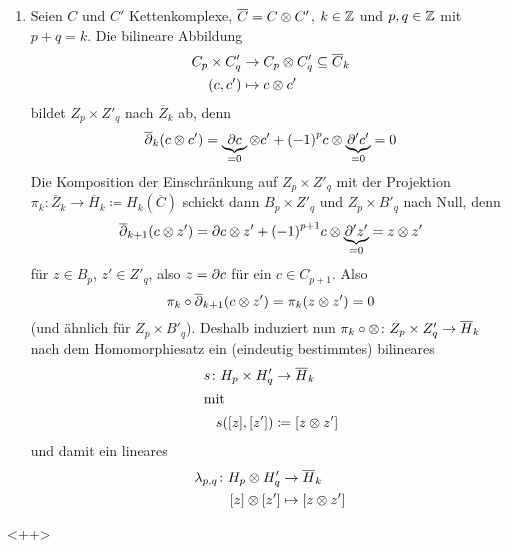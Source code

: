 \begin{vorbereitung}
  \begin{enumerate}
    \item
      Seien $C$ und $C'$ Kettenkomplexe, $\overline C = C \otimes C'$, $k \in \mathbb{Z}$ und $p, q \in \mathbb{Z}$ mit $p + q = k$.
      Die bilineare Abbildung
      \begin{align*}
        C_p \times C'_q & \to C_p \otimes C'_q \subseteq \overline C_k\\
        (c, c') & \mapsto c \otimes c'
      \end{align*}
      bildet $Z_p \times Z'_q$ nach $\overline Z_k$ ab, denn
      \begin{equation*}
        \overline {\partial}_k (c \otimes c') = \underbrace{\partial c}_{= 0} \otimes c' + {(-1)}^p c \otimes \underbrace{\partial' c'}_{= 0} = 0
      \end{equation*}
      Die Komposition der Einschränkung auf $Z_p \times Z'_q$ mit der Projektion $\pi_k \colon \overline Z_k \to \overline H_k \coloneqq H_k(\overline C)$ schickt dann $B_p \times Z'_q$ und $Z_p \times B'_q$ nach Null, denn
      \begin{equation*}
        \overline {\partial}_{k+1} (c \otimes z') = \partial c \otimes z' + {(-1)}^{p+1} c \otimes \underbrace{\partial' z'}_{= 0} = z \otimes z'
      \end{equation*}
      für $z \in B_p$, $z' \in Z'_q$, also $z = \partial c$ für ein $c \in C_{p+1}$.
      Also
      \begin{equation*}
        \pi_k \circ \overline {\partial}_{k+1} (c \otimes z') = \pi_k(z \otimes z') = 0
      \end{equation*}
      (und ähnlich für $Z_p \times B'_q$).
      Deshalb induziert nun $\pi_k \circ \otimes \colon Z_p \times Z'_q \to \overline H_k$ nach dem Homomorphiesatz ein (eindeutig bestimmtes) bilineares
      \begin{align*}
        s \colon H_p \times H'_q & \to \overline H_k \\
        \intertext{mit}
        s([z], [z']) & \coloneqq [ z \otimes z']
      \end{align*}
      und damit ein lineares
      \begin{align*}
        \lambda_{p,q} \colon H_p \otimes H'_q & \to \overline H_k\\
        [z] \otimes [z'] & \mapsto [z \otimes z']
      \end{align*}
  \end{enumerate}
\end{vorbereitung}<++>


